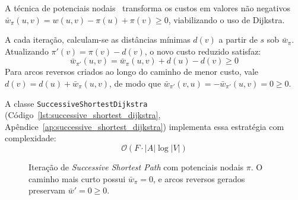 A técnica de potenciais nodais~\cite{edmonds1972theoretical} transforma os custos em valores não negativos $\bar{w}_\pi(u,v) = w(u,v) - \pi(u) + \pi(v) \ge 0$, viabilizando o uso de Dijkstra.

A cada iteração, calculam-se as distâncias mínimas $d(v)$ a partir de $s$ sob $\bar{w}_\pi$. Atualizando $\pi'(v) = \pi(v) - d(v)$, o novo custo reduzido satisfaz:
\begin{equation}
    \bar{w}_{\pi'}(u,v) = \bar{w}_\pi(u,v) + d(u) - d(v) \ge 0
\end{equation}
Para arcos reversos criados ao longo do caminho de menor custo, vale $d(v) = d(u) + \bar{w}_\pi(u,v)$, de modo que $\bar{w}_{\pi'}(v,u) = -\bar{w}_{\pi'}(u,v) = 0 \ge 0$.

A classe \lstinline{SuccessiveShortestDijkstra} (Código~\ref{lst:successive_shortest_dijkstra}, Apêndice~\ref{ap:successive_shortest_dijkstra}) implementa essa estratégia com complexidade:
\begin{equation}
    \mathcal{O}(F \cdot |A| \log |V|)
\end{equation}

\begin{figure}[!ht]
\centering
{}
\caption{Iteração de \textit{Successive Shortest Path} com potenciais nodais $\pi$. O caminho mais curto possui $\bar{w}_\pi = 0$, e arcos reversos gerados preservam $\bar{w}' = 0 \ge 0$.}
\label{fig:ssp_iteracao}
\end{figure}


